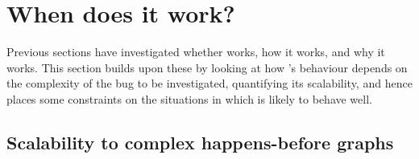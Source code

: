 \section{When does it work?}
\label{sect:eval:does_it_scale}

Previous sections have investigated whether {\technique} works, how it
works, and why it works.  This section builds upon these by looking at
how {\technique}'s behaviour depends on the complexity of the bug to
be investigated, quantifying its scalability, and hence places some
constraints on the situations in which {\technique} is likely to
behave well.

\subsection{Scalability to complex happens-before graphs}
\label{sect:eval:complex_hb}

